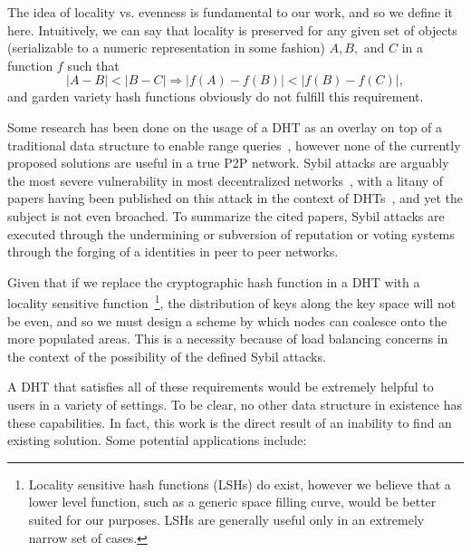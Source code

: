 \documentclass[10pt]{IEEEtran}
\begin{document}
The idea of locality vs. evenness is fundamental to our work, and so we define it here. Intuitively, we can say that locality is preserved for any given set of objects (serializable to a numeric representation in some fashion) $A,B,$ and $C$ in a function $f$ such that
\begin{equation} \label{eq:locality}
|A-B| < |B-C| \Rightarrow |f(A)-f(B)| < |f(B) - f(C)|,
\end{equation}
and garden variety hash functions obviously do not fulfill this requirement.

\par Some research has been done on the usage of a DHT as an overlay on top of a traditional data structure to enable range queries~\cite{Ramabhadran:2004tr,Desnoyers:2008uo}, however none of the currently proposed solutions are useful in a true P2P network. Sybil attacks are arguably the most severe vulnerability in most decentralized networks~, with a litany of papers having been published on this attack in the context of DHTs~, and yet the subject is not even broached. To summarize the cited papers, Sybil attacks are executed through the undermining or subversion of reputation or voting systems through the forging of a identities in peer to peer networks.

\par Given that if we replace the cryptographic hash function in a DHT with a locality sensitive function~\footnote{Locality sensitive hash functions (LSHs) do exist, however we believe that a lower level function, such as a generic space filling curve, would be better suited for our purposes. LSHs are generally useful only in an extremely narrow set of cases.}, the distribution of keys along the key space will not be even, and so we must design a scheme by which nodes can coalesce onto the more populated areas. This is a necessity because of load balancing concerns in the context of the possibility of the defined Sybil attacks.

\par A DHT that satisfies all of these requirements would be extremely helpful to users in a variety of settings. To be clear, no other data structure in existence has these capabilities. In fact, this work is the direct result of an inability to find an existing solution. Some potential applications include:
\end{document}
